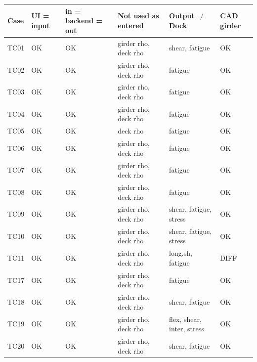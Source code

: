 \begin{tabular}{@{}llllll@{}}
\toprule
\textbf{Case} & \textbf{UI = input} & \textbf{in = backend = out} & \textbf{Not used as entered} & \textbf{Output $\ne$ Dock} & \textbf{CAD girder} \\
\midrule
TC01 & OK & OK & girder rho, deck rho & shear, fatigue & OK \\
TC02 & OK & OK & girder rho, deck rho & fatigue & OK \\
TC03 & OK & OK & girder rho, deck rho & fatigue & OK \\
TC04 & OK & OK & girder rho, deck rho & fatigue & OK \\
TC05 & OK & OK & deck rho & fatigue & OK \\
TC06 & OK & OK & girder rho, deck rho & fatigue & OK \\
TC07 & OK & OK & girder rho, deck rho & fatigue & OK \\
TC08 & OK & OK & girder rho, deck rho & fatigue & OK \\
TC09 & OK & OK & girder rho, deck rho & shear, fatigue, stress & OK \\
TC10 & OK & OK & girder rho, deck rho & shear, fatigue, stress & OK \\
TC11 & OK & OK & girder rho, deck rho & long.sh, fatigue & DIFF \\
TC17 & OK & OK & girder rho, deck rho & fatigue & OK \\
TC18 & OK & OK & girder rho, deck rho & shear, fatigue & OK \\
TC19 & OK & OK & girder rho, deck rho & flex, shear, inter, stress & OK \\
TC20 & OK & OK & girder rho, deck rho & shear, fatigue & OK \\
\bottomrule
\end{tabular}
